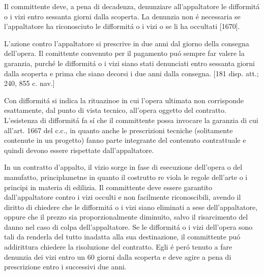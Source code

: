 \documentclass{article}
\begin{document}
Il committente deve, a pena di decadenza, denunziare all'appaltatore le difformit\'a o i vizi entro sessanta giorni dalla scoperta. La denunzia non \'e necessaria se l'appaltatore ha riconosciuto le difformit\'a o i vizi o se li ha occultati [1670]. 

L'azione contro l'appaltatore si prescrive in due anni dal giorno della consegna dell'opera. Il comittente convenuto per il pagamento pu\'o sempre far valere la garanzia, purch\'e le difformit\'a o i vizi siano stati denunciati entro sessanta giorni dalla scoperta e prima che siano decorsi i due anni dalla consegna. [181 disp. att.; 240,  855 c. nav.]

Con difformit\'a si indica la rituazinoe in cui l'opera ultimata non corrisponde esattamente, dal punto di vista tecnico, all'opera oggetto del contratto. L'esistenza di difformit\'a fa s\'i che il committente possa invocare la garanzia di cui all'art. 1667 del c.c., in quanto anche le prescrizioni tecniche (solitamente contenute in un progetto) fanno parte integrante del contenuto contrattuale e quindi devono essere rispettate dall'appaltatore.

In un contratto d'appalto, il vizio sorge in fase di esecuzione dell'opera o del manufatto, principlametne in quanto il costrutto re viola le regole dell'arte o i principi in materia di edilizia. Il committente deve essere garantito dall'appaltatore contro i vizi occulti e non facilmente riconoscibili, avendo il diritto di chiedere che le difformit\'a o i vizi siano eliminati a sese dell'appaltatore, oppure che il prezzo sia proporzionalmente diminuito, salvo il risarcimento del danno nel caso di colpa dell'appaltatore. Se le difformit\'a o i vizi dell'opera sono tali da renderla del tutto inadatta alla sua destinazione, il committente pu\'o addirittura chiedere la risoluzione del contratto. Egli \'e per\'o tenuto a fare denunzia dei vizi entro un 60 giorni dalla scoperta e deve agire a pena di prescrizione entro i successivi due anni.
\end{document}
